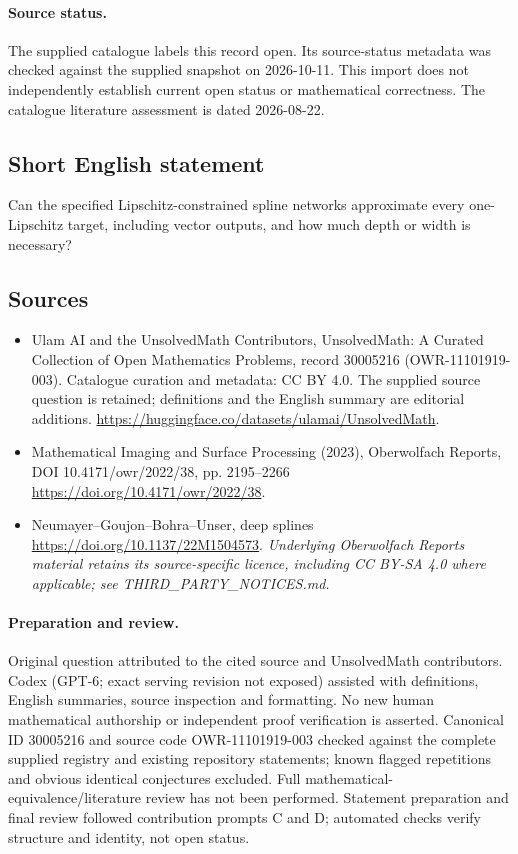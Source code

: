 \documentclass[11pt]{article}
\begin{document}
\paragraph{Source status.}
The supplied catalogue labels this record open. Its source-status metadata was checked against the supplied snapshot on 2026-10-11. This import does not independently establish current open status or mathematical correctness. The catalogue literature assessment is dated 2026-08-22.
\subsection{Short English statement}
Can the specified Lipschitz-constrained spline networks approximate every one-Lipschitz target, including vector outputs, and how much depth or width is necessary?
\subsection{Sources}
\begin{itemize}
\item[\hypertarget{source:30005216:1}{S1}] Ulam AI and the UnsolvedMath Contributors, UnsolvedMath: A Curated Collection of Open Mathematics Problems, record 30005216 (OWR-11101919-003). Catalogue curation and metadata: CC BY 4.0. The supplied source question is retained; definitions and the English summary are editorial additions.
\url{https://huggingface.co/datasets/ulamai/UnsolvedMath}.
\item[\hypertarget{source:30005216:2}{S2}] Mathematical Imaging and Surface Processing (2023), Oberwolfach Reports, DOI 10.4171/owr/2022/38, pp. 2195--2266
\url{https://doi.org/10.4171/owr/2022/38}.
\item[\hypertarget{source:30005216:3}{S3}] Neumayer--Goujon--Bohra--Unser, deep splines
\url{https://doi.org/10.1137/22M1504573}.
\textit{Underlying Oberwolfach Reports material retains its source-specific licence, including CC BY-SA 4.0 where applicable; see THIRD\_PARTY\_NOTICES.md.}
\end{itemize}
\paragraph{Preparation and review.}
Original question attributed to the cited source and UnsolvedMath contributors. Codex (GPT-6; exact serving revision not exposed) assisted with definitions, English summaries, source inspection and formatting. No new human mathematical authorship or independent proof verification is asserted. Canonical ID 30005216 and source code OWR-11101919-003 checked against the complete supplied registry and existing repository statements; known flagged repetitions and obvious identical conjectures excluded. Full mathematical-equivalence/literature review has not been performed. Statement preparation and final review followed contribution prompts C and D; automated checks verify structure and identity, not open status.
\label{end:30005216}
\end{document}

